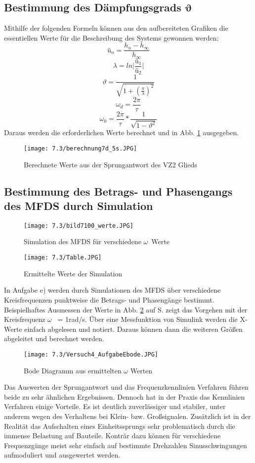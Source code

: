 \documentclass[12pt,a4paper]{scrartcl}	%
\begin{document}
\subsection{Bestimmung des Dämpfungsgrads $\pmb\vartheta$}
Mithilfe der folgenden Formeln können aus den aufbereiteten Grafiken die essentiellen Werte für die Beschreibung des Systems gewonnen werden:
\[ ü_n = \frac{h_n-h_\infty}{h_\infty}\]
\[ \lambda = ln\big|\frac{ü_1}{ü_2}\big| \]
\[ \vartheta = \frac{1}{\sqrt{1+(\frac{\pi}{\lambda})^2}} \]
\[ \omega_d = \frac{2\pi}{\tau} \]
\[ \omega_0 = \frac{2\pi}{\tau} * \frac{1}{\sqrt{1-\vartheta^2}} \]
Daraus werden die erforderlichen Werte berechnet und in Abb. \ref{werte} ausgegeben.
\begin{figure}[tbh]
	\centering
	\texttt{[image: 7.3/berechnung7d\_5s.JPG]}
	\caption{Berechnete Werte aus der Sprungantwort des VZ2  Glieds}
	\label{werte}
\end{figure}
\subsection{Bestimmung des Betrags- und Phasengangs des MFDS durch Simulation}
\begin{figure}[tbh]
	\centering
	\texttt{[image: 7.3/bild7100\_werte.JPG]}
	\caption{Simulation des MFDS für verschiedene $\omega$~Werte}
	\label{ph}
\end{figure}
\begin{figure}[tbh]
	\centering
	\texttt{[image: 7.3/Table.JPG]}
	\caption{Ermittelte Werte der Simulation}
\end{figure}
In Aufgabe e) werden durch Simulationen des MFDS über verschiedene Kreisfrequenzen punktweise die Betrags- und Phasengänge bestimmt.\\
Beispielhaftes Ausmessen der Werte in Abb. \ref{ph} auf S. \pageref{ph} zeigt das Vorgehen mit der Kreisfrequenz $\omega$~ = 1rad/s. Über eine Messfunktion von Simulink werden die X-Werte einfach abgelesen und notiert. Daraus können dann die weiteren Größen abgeleitet und berechnet werden.\\
\begin{figure}[tbh]
	\centering
	\texttt{[image: 7.3/Versuch4\_AufgabeEbode.JPG]}
	\caption{Bode Diagramm aus ermittelten $\omega$ Werten}
\end{figure}
Das Auswerten der Sprungantwort und das Frequenzkennlinien Verfahren führen beide zu sehr ähnlichen Ergebnissen.
Dennoch hat in der Praxis das Kennlinien Verfahren einige Vorteile. Es ist deutlich zuverlässiger und stabiler, unter anderem wegen des Verhaltens bei Klein- bzw. Großsignalen. Zusätzlich ist in der Realität das Aufschalten eines Einheitssprungs sehr problematisch durch die immense Belastung auf Bauteile. Konträr dazu können für verschiedene Frequenzgänge meist sehr einfach auf bestimmte Drehzahlen Sinusschwingungen aufmoduliert und ausgewertet werden.
\clearpage
\end{document}
